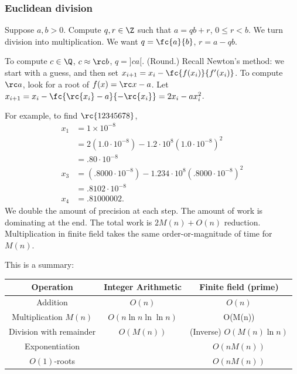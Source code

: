 \subsubsection{Euclidean division}
Suppose $a,b>0$. Compute $q,r\in \Z$ such that $a=qb+r$, $0\le r<b$.
We turn division into multiplication.
We want $q=\fc{a}{b}$, $r=a-qb$.

To compute $c\in \Q$, $c\approx \rc b$, $q=]ca[$. (Round.) Recall Newton's method: we start with a guess, and then set $x_{i+1}=x_i-\fc{f(x_i)}{f'(x_i)}$. To compute $\rc a$, look for a root of $f(x)=\rc x-a$. Let $x_{i+1}=x_i-\fc{\rc{x_i}-a}{-\rc{x_i}}=2x_i-ax_i^2$. 

For example,  to find $\rc{12345678}$,
\begin{align*}
x_1& = 1\times 10^{-8}\\
&=2(1.0\cdot 10^{-8}) - 1.2\cdot 10^8(1.0\cdot 10^{-8})^2\\
&=.80\cdot 10^{-8}\\
x_3&=(.8000\cdot 10^{-8})-1.234\cdot 10^8 (.8000\cdot 10^{-8})^2\\
&=.8102\cdot 10^{-8}\\
x_4&= .81000002.
\end{align*}%
We double the amount of precision at each step. The amount of work is dominating at the end. The total work is %
$2M(n)+O(n)$ reduction. Multiplication in finite field takes the same order-or-magnitude of time for $M(n)$. 

This is a summary:

\begin{tabular}{|c|c|c|}
\hline
Operation & Integer Arithmetic & Finite field (prime)\\
\hline
Addition & $O(n)$ & $O(n)$\\
\hline 
Multiplication $M(n)$& $O(n\ln n\ln\ln n)$&O(M(n))\\
\hline
Division with remainder &$O(M(n))$& (Inverse) $O(M(n)\ln n)$\\
\hline
Exponentiation & & $O(nM(n))$\\
\hline
$O(1)$-roots & & $O(nM(n))$\\
\hline
\end{tabular}

